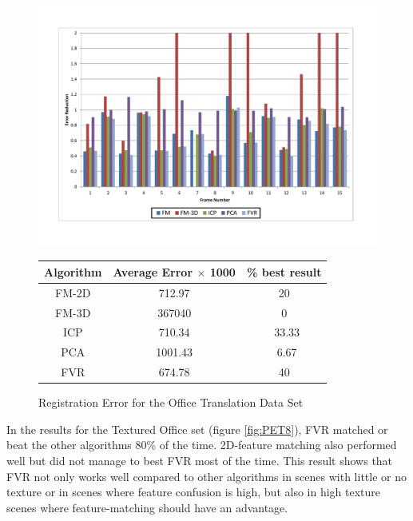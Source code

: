 \begin{figure}
\centering
\includegraphics[width=6in]{images/results/Office_TexturedItems_Translation}
\caption{Registration Error for the Office Translation Data Set}
\label{fig:PET8}

\begin{tabular}{ccc}
\hline
\textbf{Algorithm} & \textbf{Average Error $\times$ 1000} & \textbf{\% best result}\\ \hline
FM-2D	& 712.97 & 20\\
FM-3D	& 367040 & 0\\
ICP		& 710.34 & ~33.33\\
PCA		& 1001.43 & ~6.67\\
FVR		& 674.78 & 40\\
\end{tabular}
\label{tab:PET8ST}
\end{figure} 


In the results for the Textured Office set (figure \ref{fig:PET8}), FVR matched or beat the other algorithms 80\% of the time. 2D-feature matching also performed well but did not manage to best FVR most of the time. This result shows that FVR not only works well compared to other algorithms in scenes with little or no texture or in scenes where feature confusion is high, but also in high texture scenes where feature-matching should have an advantage. \\


